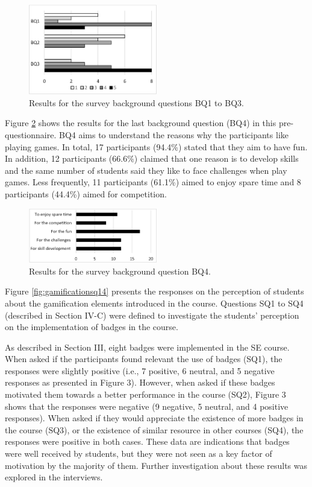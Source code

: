 \begin{figure}[!h]%
\centering
\includegraphics[width = 0.5\textwidth]{img/gamificationBQ.png}
\caption{Results for the survey background questions BQ1 to BQ3.}
\label{fig:gamificationbq}
\end{figure}

Figure \ref{fig:gamificationbq4} shows the results for the last background question (BQ4) in this pre-questionnaire. BQ4 aims to understand the reasons why the participants like playing games. In total, 17 participants (94.4\%) stated that they aim to have fun. In addition, 12 participants (66.6\%) claimed that one reason is to develop skills and the same number of students said they like to face challenges when play games. Less frequently, 11 participants (61.1\%) aimed to enjoy spare time and 8 participants (44.4\%) aimed for competition.

\begin{figure}[!h]%
\centering
\includegraphics[width = 0.5\textwidth]{img/gamificationBQ4.png}
\caption{Results for the survey background question BQ4.}
\label{fig:gamificationbq4}
\end{figure}

Figure \ref{fig:gamificationsq14} presents the responses on the perception of students about the gamification elements introduced in the course. Questions SQ1 to SQ4 (described in Section IV-C) were defined to investigate the students’ perception on the implementation of badges in the course. 

As described in Section III, eight badges were implemented in the SE course. When asked if the participants found relevant the use of badges (SQ1), the responses were slightly positive (i.e., 7 positive, 6 neutral, and 5 negative responses as presented in Figure 3). However, when asked if these badges motivated them towards a better performance in the course (SQ2), Figure 3 shows that the responses were negative (9 negative, 5 neutral, and 4 positive responses). When asked if they would appreciate the existence of more badges in the course (SQ3), or the existence of similar resource in other courses (SQ4), the responses were positive in both cases. These data are indications that badges were well received by students, but they were not seen as a key factor of motivation by the majority of them. Further investigation about these results was explored in the interviews.

